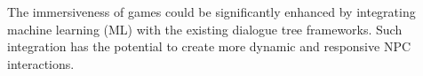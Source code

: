 











The immersiveness of games could be significantly enhanced by integrating machine learning (ML) with the existing dialogue tree frameworks. Such integration has the potential to create more dynamic and responsive NPC interactions.












